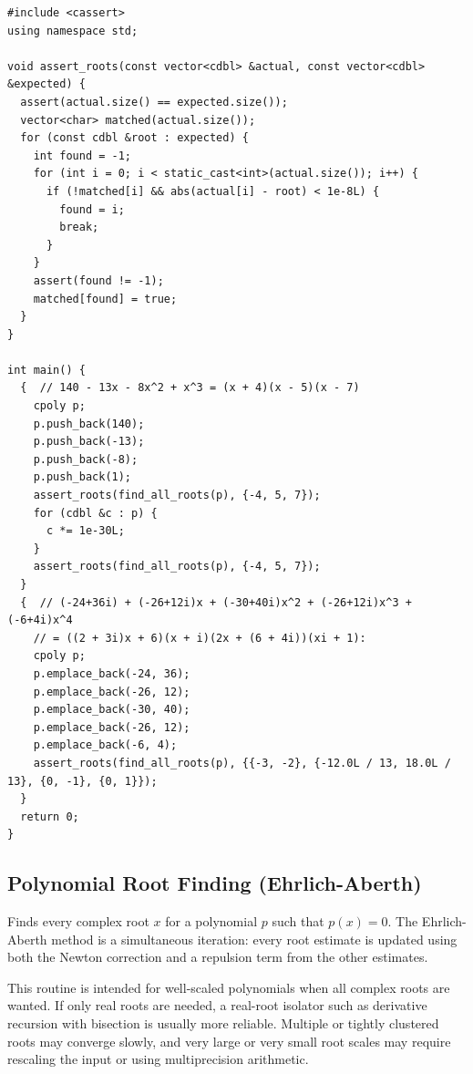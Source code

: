 \begin{lstlisting}[style=cpp]
#include <cassert>
using namespace std;

void assert_roots(const vector<cdbl> &actual, const vector<cdbl> &expected) {
  assert(actual.size() == expected.size());
  vector<char> matched(actual.size());
  for (const cdbl &root : expected) {
    int found = -1;
    for (int i = 0; i < static_cast<int>(actual.size()); i++) {
      if (!matched[i] && abs(actual[i] - root) < 1e-8L) {
        found = i;
        break;
      }
    }
    assert(found != -1);
    matched[found] = true;
  }
}

int main() {
  {  // 140 - 13x - 8x^2 + x^3 = (x + 4)(x - 5)(x - 7)
    cpoly p;
    p.push_back(140);
    p.push_back(-13);
    p.push_back(-8);
    p.push_back(1);
    assert_roots(find_all_roots(p), {-4, 5, 7});
    for (cdbl &c : p) {
      c *= 1e-30L;
    }
    assert_roots(find_all_roots(p), {-4, 5, 7});
  }
  {  // (-24+36i) + (-26+12i)x + (-30+40i)x^2 + (-26+12i)x^3 + (-6+4i)x^4
    // = ((2 + 3i)x + 6)(x + i)(2x + (6 + 4i))(xi + 1):
    cpoly p;
    p.emplace_back(-24, 36);
    p.emplace_back(-26, 12);
    p.emplace_back(-30, 40);
    p.emplace_back(-26, 12);
    p.emplace_back(-6, 4);
    assert_roots(find_all_roots(p), {{-3, -2}, {-12.0L / 13, 18.0L / 13}, {0, -1}, {0, 1}});
  }
  return 0;
}
\end{lstlisting}
\subsection{Polynomial Root Finding (Ehrlich-Aberth)}
\label{sec:5.4.5}
Finds every complex root $x$ for a polynomial $p$ such that $p(x) = 0$. The Ehrlich-Aberth method is a simultaneous iteration: every root estimate is updated using both the Newton correction and a repulsion term from the other estimates.

This routine is intended for well-scaled polynomials when all complex roots are wanted. If only real roots are needed, a real-root isolator such as derivative recursion with bisection is usually more reliable. Multiple or tightly clustered roots may converge slowly, and very large or very small root scales may require rescaling the input or using multiprecision arithmetic.

